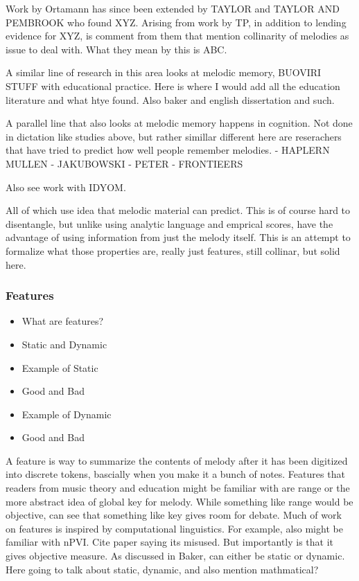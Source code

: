 \documentclass[english,man,floatsintext]{apa6}
\providecommand{\tightlist}{%
  \setlength{\itemsep}{0pt}\setlength{\parskip}{0pt}}
\begin{document}
Work by Ortamann has since been extended by TAYLOR and TAYLOR AND PEMBROOK who found XYZ.
Arising from work by TP, in addition to lending evidence for XYZ, is comment from them that mention collinarity of melodies as issue to deal with.
What they mean by this is ABC.

A similar line of research in this area looks at melodic memory, BUOVIRI STUFF with educational practice.
Here is where I would add all the education literature and what htye found.
Also baker and english dissertation and such.

A parallel line that also looks at melodic memory happens in cognition.
Not done in dictation like studies above, but rather simillar different here are reserachers that have tried to predict how well people remember melodies.
- HAPLERN MULLEN
- JAKUBOWSKI
- PETER
- FRONTIEERS

Also see work with IDYOM.

All of which use idea that melodic material can predict.
This is of course hard to disentangle, but unlike using analytic language and emprical scores, have the advantage of using information from just the melody itself.
This is an attempt to formalize what those properties are, really just features, still collinar, but solid here.

\hypertarget{features}{%
\subsubsection{Features}\label{features}}

\begin{itemize}
\tightlist
\item
  What are features?
\item
  Static and Dynamic
\item
  Example of Static
\item
  Good and Bad
\item
  Example of Dynamic
\item
  Good and Bad
\end{itemize}

A feature is way to summarize the contents of melody after it has been digitized into discrete tokens, bascially when you make it a bunch of notes.
Features that readers from music theory and education might be familiar with are range or the more abstract idea of global key for melody.
While something like range would be objective, can see that something like key gives room for debate.
Much of work on features is inspired by computational linguistics.
For example, also might be familiar with nPVI.
Cite paper saying its misused.
But importantly is that it gives objective measure.
As discussed in Baker, can either be static or dynamic.
Here going to talk about static, dynamic, and also mention mathmatical?
\end{document}
